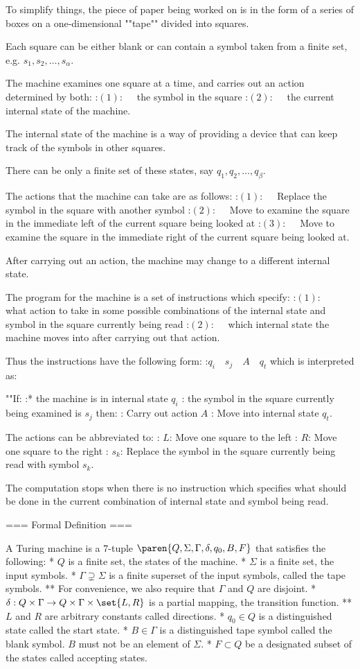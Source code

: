 To simplify things, the piece of paper being worked on is in the form of a series of boxes on a one-dimensional ""tape"" divided into squares.

Each square can be either blank or can contain a symbol taken from a finite set, e.g. $s_1, s_2, \ldots, s_\alpha$.


The machine examines one square at a time, and carries out an action determined by both:
:$(1): \quad$ the symbol in the square
:$(2): \quad$ the current internal state of the machine.

The internal state of the machine is a way of providing a device that can keep track of the symbols in other squares.

There can be only a finite set of these states, say $q_1, q_2, \ldots, q_\beta$.


The actions that the machine can take are as follows:
:$(1): \quad$ Replace the symbol in the square with another symbol
:$(2): \quad$ Move to examine the square in the immediate left of the current square being looked at
:$(3): \quad$ Move to examine the square in the immediate right of the current square being looked at.

After carrying out an action, the machine may change to a different internal state.


The program for the machine is a set of instructions which specify:
:$(1): \quad$ what action to take in some possible combinations of the internal state and symbol in the square currently being read
:$(2): \quad$ which internal state the machine moves into after carrying out that action.

Thus the instructions have the following form:
:$q_i \quad s_j \quad A \quad q_t$
which is interpreted as:

""If:
:* the machine is in internal state $q_i$
: the symbol in the square currently being examined is $s_j$
then:
: Carry out action $A$
: Move into internal state $q_t$.


The actions can be abbreviated to:
: $L$: Move one square to the left
: $R$: Move one square to the right
: $s_k$: Replace the symbol in the square currently being read with symbol $s_k$.


The computation stops when there is no instruction which specifies what should be done in the current combination of internal state and symbol being read.

=== Formal Definition ===


A Turing machine is a 7-tuple $\paren {Q, \Sigma, \Gamma, \delta, q_0, B, F}$ that satisfies the following:
* $Q$ is a finite set, the states of the machine.
* $\Sigma$ is a finite set, the input symbols.
* $\Gamma \supsetneq \Sigma$ is a finite superset of the input symbols, called the tape symbols.
** For convenience, we also require that $\Gamma$ and $Q$ are disjoint.
* $\delta : Q \times \Gamma \to Q \times \Gamma \times \set {L, R}$ is a partial mapping, the transition function.
** $L$ and $R$ are arbitrary constants called directions.
* $q_0 \in Q$ is a distinguished state called the start state.
* $B \in \Gamma$ is a distinguished tape symbol called the blank symbol. $B$ must not be an element of $\Sigma$.
* $F \subset Q$ be a designated subset of the states called accepting states.


